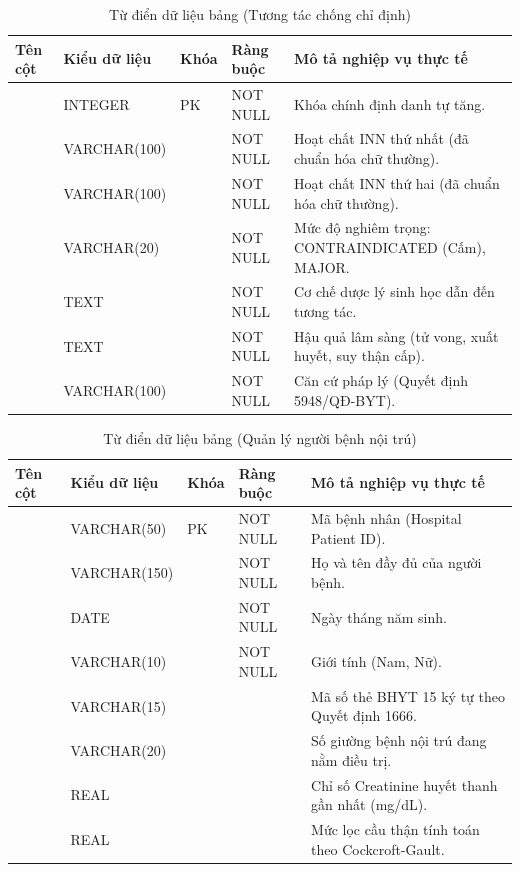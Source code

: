 \begin{table}[htbp]
\centering
\small
\begin{tabularx}{\textwidth}{L{3.2cm} L{2.2cm} C{1.2cm} C{1.8cm} Y}
\toprule
\textbf{Tên cột} & \textbf{Kiểu dữ liệu} & \textbf{Khóa} & \textbf{Ràng buộc} & \textbf{Mô tả nghiệp vụ thực tế} \\
\midrule
{} & INTEGER & PK & NOT NULL & Khóa chính định danh tự tăng. \\
 & VARCHAR(100) & & NOT NULL & Hoạt chất INN thứ nhất (đã chuẩn hóa chữ thường). \\
 & VARCHAR(100) & & NOT NULL & Hoạt chất INN thứ hai (đã chuẩn hóa chữ thường). \\
 & VARCHAR(20) & & NOT NULL & Mức độ nghiêm trọng: CONTRAINDICATED (Cấm), MAJOR. \\
 & TEXT & & NOT NULL & Cơ chế dược lý sinh học dẫn đến tương tác. \\
 & TEXT & & NOT NULL & Hậu quả lâm sàng (tử vong, xuất huyết, suy thận cấp). \\
 & VARCHAR(100) & & NOT NULL & Căn cứ pháp lý (Quyết định 5948/QĐ-BYT). \\
\bottomrule
\end{tabularx}
\caption{Từ điển dữ liệu bảng  (Tương tác chống chỉ định)}
\end{table}

\begin{table}[htbp]
\centering
\small
\begin{tabularx}{\textwidth}{L{3.2cm} L{2.2cm} C{1.2cm} C{1.8cm} Y}
\toprule
\textbf{Tên cột} & \textbf{Kiểu dữ liệu} & \textbf{Khóa} & \textbf{Ràng buộc} & \textbf{Mô tả nghiệp vụ thực tế} \\
\midrule
{} & VARCHAR(50) & PK & NOT NULL & Mã bệnh nhân (Hospital Patient ID). \\
 & VARCHAR(150) & & NOT NULL & Họ và tên đầy đủ của người bệnh. \\
 & DATE & & NOT NULL & Ngày tháng năm sinh. \\
 & VARCHAR(10) & & NOT NULL & Giới tính (Nam, Nữ). \\
 & VARCHAR(15) & & & Mã số thẻ BHYT 15 ký tự theo Quyết định 1666. \\
 & VARCHAR(20) & & & Số giường bệnh nội trú đang nằm điều trị. \\
 & REAL & & & Chỉ số Creatinine huyết thanh gần nhất (mg/dL). \\
 & REAL & & & Mức lọc cầu thận tính toán theo Cockcroft-Gault. \\
\bottomrule
\end{tabularx}
\caption{Từ điển dữ liệu bảng  (Quản lý người bệnh nội trú)}
\end{table}

